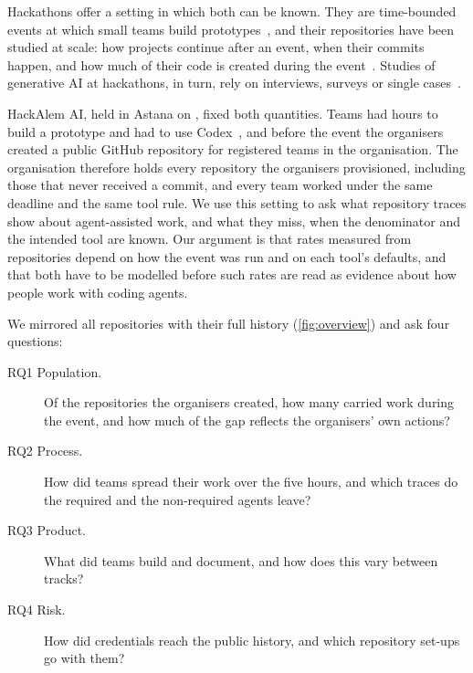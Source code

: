 \documentclass{article}
\begin{document}
Hackathons offer a setting in which both can be known. They are time-bounded events at which small teams build prototypes~\cite{chau2023hackathons}, and their repositories have been studied at scale: how projects continue after an event, when their commits happen, and how much of their code is created during the event~\cite{nolte2020hackathon,mcintosh2021hackathon,imam2021secretlife,mahmoud2022oneoff,halmans2026hackrep}. Studies of generative AI at hackathons, in turn, rely on interviews, surveys or single cases~\cite{zhou2026quickbuild,gama2025vibes,chen2026codeforall,sajja2024genaihack}.

HackAlem AI, held in Astana on \eventdate, fixed both quantities. Teams had \eventhours{} hours to build a prototype and had to use Codex~\cite{hackalem2026site}, and before the event the organisers created a public GitHub repository for registered teams in the \ghorg{} organisation. The organisation therefore holds every repository the organisers provisioned, including those that never received a commit, and every team worked under the same deadline and the same tool rule. We use this setting to ask what repository traces show about agent-assisted work, and what they miss, when the denominator and the intended tool are known. Our argument is that rates measured from repositories depend on how the event was run and on each tool's defaults, and that both have to be modelled before such rates are read as evidence about how people work with coding agents.

We mirrored all \NRqOneTotal{} repositories with their full history (\cref{fig:overview}) and ask four questions:
\begin{description}
  \item[RQ1 Population.] Of the repositories the organisers created, how many carried work during the event, and how much of the gap reflects the organisers' own actions?
  \item[RQ2 Process.] How did teams spread their work over the five hours, and which traces do the required and the non-required agents leave?
  \item[RQ3 Product.] What did teams build and document, and how does this vary between tracks?
  \item[RQ4 Risk.] How did credentials reach the public history, and which repository set-ups go with them?
\end{description}
\end{document}
